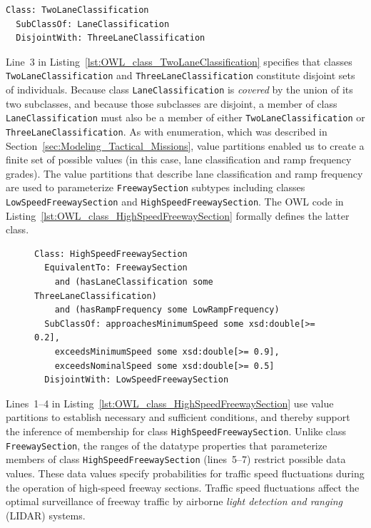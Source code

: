 \begin{lstlisting}[caption={OWL code for class \texttt{TwoLaneClassification}},label=lst:OWL_class_TwoLaneClassification]
Class: TwoLaneClassification
  SubClassOf: LaneClassification
  DisjointWith: ThreeLaneClassification
\end{lstlisting}

Line~3 in Listing~\ref{lst:OWL_class_TwoLaneClassification} specifies that classes \texttt{TwoLaneClassification} and \texttt{ThreeLane\-Classification} constitute disjoint sets of individuals. Because class \texttt{LaneClassifica\-tion} is \emph{covered} by the union of its two subclasses, and because those subclasses are disjoint, a member of class \texttt{LaneClassification} must also be a member of either \texttt{TwoLaneClassification} or \texttt{ThreeLaneClassification}. As with enumeration, which was described in Section~\ref{sec:Modeling_Tactical_Missions}, value partitions enabled us to create a finite set of possible values (in this case, lane classification and ramp frequency grades). The value partitions that describe lane classification and ramp frequency are used to parameterize \texttt{FreewaySection} subtypes including classes \texttt{LowSpeedFreewaySection} and \texttt{HighSpeed\-FreewaySection}. The OWL code in Listing~\ref{lst:OWL_class_HighSpeedFreewaySection} formally defines the latter class.

\begin{figure}[ht]
\begin{lstlisting}[caption={OWL code for class \texttt{HighSpeedFreewaySection}},label=lst:OWL_class_HighSpeedFreewaySection]
Class: HighSpeedFreewaySection
  EquivalentTo: FreewaySection
    and (hasLaneClassification some ThreeLaneClassification)
    and (hasRampFrequency some LowRampFrequency)
  SubClassOf: approachesMinimumSpeed some xsd:double[>= 0.2],
    exceedsMinimumSpeed some xsd:double[>= 0.9],
    exceedsNominalSpeed some xsd:double[>= 0.5]
  DisjointWith: LowSpeedFreewaySection
\end{lstlisting}
\end{figure}

Lines~1--4 in Listing~\ref{lst:OWL_class_HighSpeedFreewaySection} use value partitions to establish necessary and sufficient conditions, and thereby support the inference of membership for class \texttt{HighSpeedFreeway\-Section}. Unlike class \texttt{FreewaySection}, the ranges of the datatype properties that parameterize members of class \texttt{HighSpeedFreewaySection} (lines~5--7) restrict possible data values. These data values specify probabilities for traffic speed fluctuations during the operation of high-speed freeway sections. Traffic speed fluctuations affect the optimal surveillance of freeway traffic by airborne \emph{light detection and ranging} (LIDAR) systems.

